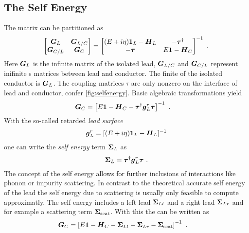 \subsection{The Self Energy}
The \gfnc{} matrix can be partitioned as
\begin{align}
  \begin{bmatrix}
  \boldsymbol{G}_{L} & \boldsymbol{G}_{L/C}\\
  \boldsymbol{G}_{C/L} & \boldsymbol{G}_{C}
  \end{bmatrix}
  =
  \begin{bmatrix}
  (E+i\eta)\boldsymbol{1}_{L} - \boldsymbol{H}_L  & -\boldsymbol{\tau}^{\dagger} \\
	-\boldsymbol{\tau} & E\boldsymbol{1} - \boldsymbol{H}_C
  \end{bmatrix}^{-1}\ .
  \label{eqn:greendivided}
\end{align}
Here $\boldsymbol{G}_L$ is the infinite \gfnc{} matrix of the isolated lead, $\boldsymbol{G}_{L/C}$ and $\boldsymbol{G}_{C/L}$ represent inifinite \gfnc s matrices between lead and conductor. The finite \gfnc{} of the isolated conductor is $\boldsymbol{G}_L$. The coupling matrices $\tau$ are only nonzero on the interface of lead and conductor, confer \cref{fig:selfenergy}.
Basic algebraic transformations yield \cite{Datta1997}
\begin{align}
\boldsymbol{G}_C& = \left[E\boldsymbol{1}-\boldsymbol{H}_C -\boldsymbol{\tau}^{\dagger} \boldsymbol{g}_L^r \boldsymbol{\tau} \right]^{-1} \ .
\label{eqn:finitegreensfunction}
\end{align}
With the so-called retarded \emph{lead surface \gfnc{}}
\begin{align}
\boldsymbol{g}_L^r = [(E+i\eta)\boldsymbol{1}_L - \boldsymbol{H}_L]^{-1}
\label{eqn:leadsurfacegfnc}
\end{align}
one can write the \emph{self energy} term $\boldsymbol{\Sigma}_L$ as
\begin{align}
\boldsymbol{\Sigma}_L = \boldsymbol{\tau}^{\dagger} \boldsymbol{g}_L^r \boldsymbol{\tau}\ .
\end{align}
The concept of the self energy allows for further inclusions of interactions like phonon or impurity scattering. In contrast to the theoretical accurate self energy of the lead the self energy due to scattering is usually only feasible to compute approximatly. The self energy includes a left lead $\boldsymbol{\Sigma}_{Ll}$ and a right lead $\boldsymbol{\Sigma}_{Lr}$ and for example a scattering term $\boldsymbol{\Sigma}_{\text{scat}}$. With this the \gfnc{} can be written as
\begin{align}
\boldsymbol{G}_C& = \left[E\boldsymbol{1}-\boldsymbol{H}_C -\boldsymbol{\Sigma}_{Ll}-\boldsymbol{\Sigma}_{Lr}-\boldsymbol{\Sigma}_{\text{scat}} \right]^{-1} \ .
\label{eqn:finitegreensfunctionwithselfenergy}
\end{align}
